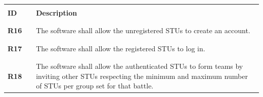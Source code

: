 \renewcommand{\arraystretch}{0.5}
\begin{longtable}[H]{l l p{12cm}}
    \hline
                 &        &                                                                                                                                                                                                                             \\
    \textbf{ID}  & \vline & \textbf{Description}                                                                                                                                                                                                        \\
                 &        &                                                                                                                                                                                                                             \\\hline & & \\   
    \textbf{R16} & \vline & The software shall allow the unregistered STUs to create an account.                                                                                                                                                        \\
                 &        &                                                                                                                                                                                                                             \\\hline & & \\   
    \textbf{R17} & \vline & The software shall allow the registered STUs to log in.                                                                                                                                                                     \\
                 &        &                                                                                                                                                                                                                             \\\hline & & \\   
    \textbf{R18} & \vline & The software shall allow the authenticated STUs to form teams by inviting other STUs respecting the minimum and maximum number of STUs per group set for that battle.                                                       \\

\end{longtable}
